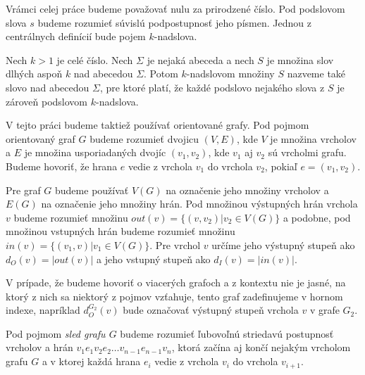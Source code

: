 Vrámci celej práce budeme považovať nulu za prirodzené číslo. Pod podslovom slova $s$
budeme rozumieť súvislú podpostupnosť jeho písmen. Jednou z centrálnych definícií bude
pojem $k$-nadslova.

\begin{defn}
    Nech $k > 1$ je celé číslo. Nech $\Sigma$ je nejaká abeceda a nech $S$ je množina
    slov dlhých aspoň $k$ nad abecedou $\Sigma$. Potom $k$-nadslovom množiny $S$ nazveme také slovo
    nad abecedou $\Sigma$, pre ktoré platí, že každé podslovo nejakého slova z $S$ je
    zároveň podslovom $k$-nadslova.
\end{defn}

V tejto práci budeme taktiež používať orientované grafy. Pod pojmom orientovaný graf $G$ budeme
rozumieť dvojicu $(V, E)$, kde $V$ je množina vrcholov a $E$ je množina usporiadaných
dvojíc $(v_1, v_2)$, kde $v_1$ aj $v_2$ sú vrcholmi grafu. Budeme hovoriť, že hrana $e$ vedie
z vrchola $v_1$ do vrchola $v_2$, pokiaľ $e = (v_1, v_2)$.

Pre graf $G$ budeme používať $V(G)$ na označenie jeho množiny vrcholov a $E(G)$ na označenie jeho
množiny hrán. Pod množinou výstupných hrán
vrchola $v$ budeme rozumieť množinu $out(v) = \{ (v, v_2) | v_2 \in V(G) \}$ a podobne,
pod množinou vstupných hrán budeme rozumieť množinu $in(v) = \{ (v_1, v) | v_1 \in V(G) \}$.
Pre vrchol $v$ určíme jeho výstupný stupeň ako $d_O(v) = |out(v)|$ a jeho vstupný stupeň ako $d_I(v) = |in(v)|$.

V prípade, že budeme hovoriť o viacerých grafoch a z kontextu nie je jasné, na ktorý z nich
sa niektorý z pojmov vzťahuje, tento graf zadefinujeme v hornom indexe, napríklad
$d_O^{G_2}(v)$ bude označovať výstupný stupeň vrchola $v$ v grafe $G_2$.

Pod pojmom \emph{sled grafu $G$} budeme rozumieť ľubovoľnú striedavú postupnosť vrcholov
a hrán $v_1 e_1 v_2 e_2 \ldots v_{n-1} e_{n-1} v_n$, ktorá začína aj končí nejakým vrcholom
grafu $G$ a v ktorej každá hrana $e_i$ vedie z vrchola $v_i$ do vrchola $v_{i+1}$.

